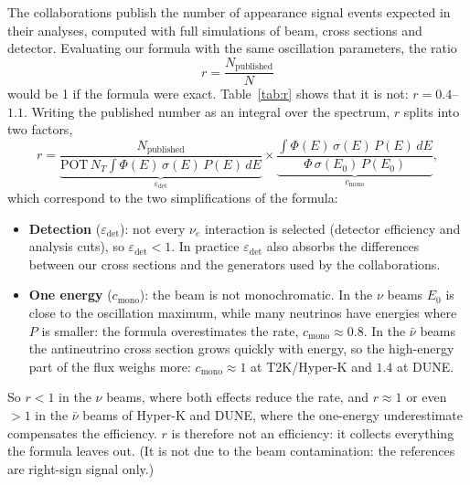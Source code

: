 \documentclass[11pt,a4paper]{article}
\begin{document}
The collaborations publish the number of appearance signal events expected in their analyses, computed with full
simulations of beam, cross sections and detector. Evaluating our formula with the same oscillation parameters, the
ratio
\begin{equation*}
  r = \frac{N_\text{published}}{N}
\end{equation*}
would be 1 if the formula were exact. Table~\ref{tab:r} shows that it is not: $r = 0.4$--$1.1$.
Writing the published number as an integral over the spectrum, $r$ splits into two factors,
\begin{equation*}
  r = \underbrace{\frac{N_\text{published}}{\mathrm{POT}\,N_T\int\Phi(E)\,\sigma(E)\,P(E)\,dE}}_{\varepsilon_\text{det}}
  \times
  \underbrace{\frac{\int\Phi(E)\,\sigma(E)\,P(E)\,dE}{\Phi\,\sigma(E_0)\,P(E_0)}}_{c_\text{mono}} ,
\end{equation*}
which correspond to the two simplifications of the formula:
\begin{itemize}
  \item \textbf{Detection} ($\varepsilon_\text{det}$): not every $\nu_e$ interaction is selected (detector
        efficiency and analysis cuts), so $\varepsilon_\text{det}<1$. In practice $\varepsilon_\text{det}$ also
        absorbs the differences between our cross sections and the generators used by the collaborations.
  \item \textbf{One energy} ($c_\text{mono}$): the beam is not monochromatic. In the $\nu$ beams $E_0$ is close to
        the oscillation maximum, while many neutrinos have energies where $P$ is smaller: the formula overestimates
        the rate, $c_\text{mono}\approx0.8$. In the $\bar\nu$ beams the antineutrino cross section grows quickly with
        energy, so the high-energy part of the flux weighs more: $c_\text{mono}\approx1$ at T2K/Hyper-K and $1.4$ at DUNE.
\end{itemize}
So $r<1$ in the $\nu$ beams, where both effects reduce the rate, and $r\approx1$ or even $>1$ in the $\bar\nu$ beams of
Hyper-K and DUNE, where the one-energy underestimate compensates the efficiency. $r$ is therefore not an efficiency:
it collects everything the formula leaves out. (It is not due to the beam contamination: the references are right-sign
signal only.)
\end{document}
